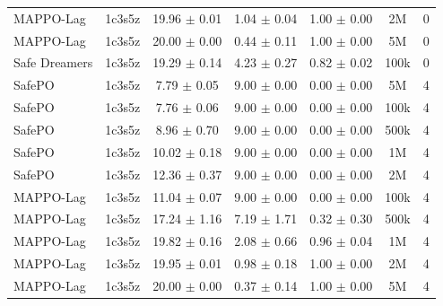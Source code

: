 \begin{longtable}{lcccccc}
MAPPO-Lag & 1c3s5z & \textcolor{red!70!black}{19.96 $\pm$ 0.01} & \textcolor{red!70!black}{1.04 $\pm$ 0.04} & \textcolor{red!70!black}{1.00 $\pm$ 0.00} & 2M & 0 \\
MAPPO-Lag & 1c3s5z & \textcolor{red!70!black}{20.00 $\pm$ 0.00} & \textcolor{red!70!black}{0.44 $\pm$ 0.11} & \textcolor{red!70!black}{1.00 $\pm$ 0.00} & 5M & 0 \\
Safe Dreamers & 1c3s5z & 19.29 $\pm$ 0.14 & 4.23 $\pm$ 0.27 & 0.82 $\pm$ 0.02 & 100k & 0 \\
\midrule
SafePO & 1c3s5z & \textcolor{green!60!black}{7.79 $\pm$ 0.05} & \textcolor{green!60!black}{9.00 $\pm$ 0.00} & \textcolor{green!60!black}{0.00 $\pm$ 0.00} & 5M & 4 \\
SafePO & 1c3s5z & \textcolor{green!60!black}{7.76 $\pm$ 0.06} & \textcolor{green!60!black}{9.00 $\pm$ 0.00} & \textcolor{green!60!black}{0.00 $\pm$ 0.00} & 100k & 4 \\
SafePO & 1c3s5z & \textcolor{green!60!black}{8.96 $\pm$ 0.70} & \textcolor{green!60!black}{9.00 $\pm$ 0.00} & \textcolor{green!60!black}{0.00 $\pm$ 0.00} & 500k & 4 \\
SafePO & 1c3s5z & \textcolor{green!60!black}{10.02 $\pm$ 0.18} & \textcolor{green!60!black}{9.00 $\pm$ 0.00} & \textcolor{green!60!black}{0.00 $\pm$ 0.00} & 1M & 4 \\
SafePO & 1c3s5z & \textcolor{green!60!black}{12.36 $\pm$ 0.37} & \textcolor{green!60!black}{9.00 $\pm$ 0.00} & \textcolor{green!60!black}{0.00 $\pm$ 0.00} & 2M & 4 \\
MAPPO-Lag & 1c3s5z & \textcolor{green!60!black}{11.04 $\pm$ 0.07} & \textcolor{green!60!black}{9.00 $\pm$ 0.00} & \textcolor{green!60!black}{0.00 $\pm$ 0.00} & 100k & 4 \\
MAPPO-Lag & 1c3s5z & \textcolor{green!60!black}{17.24 $\pm$ 1.16} & \textcolor{green!60!black}{7.19 $\pm$ 1.71} & \textcolor{green!60!black}{0.32 $\pm$ 0.30} & 500k & 4 \\
MAPPO-Lag & 1c3s5z & \textcolor{red!70!black}{19.82 $\pm$ 0.16} & \textcolor{red!70!black}{2.08 $\pm$ 0.66} & \textcolor{red!70!black}{0.96 $\pm$ 0.04} & 1M & 4 \\
MAPPO-Lag & 1c3s5z & \textcolor{red!70!black}{19.95 $\pm$ 0.01} & \textcolor{red!70!black}{0.98 $\pm$ 0.18} & \textcolor{red!70!black}{1.00 $\pm$ 0.00} & 2M & 4 \\
MAPPO-Lag & 1c3s5z & \textcolor{red!70!black}{20.00 $\pm$ 0.00} & \textcolor{red!70!black}{0.37 $\pm$ 0.14} & \textcolor{red!70!black}{1.00 $\pm$ 0.00} & 5M & 4 \\

\end{longtable}
